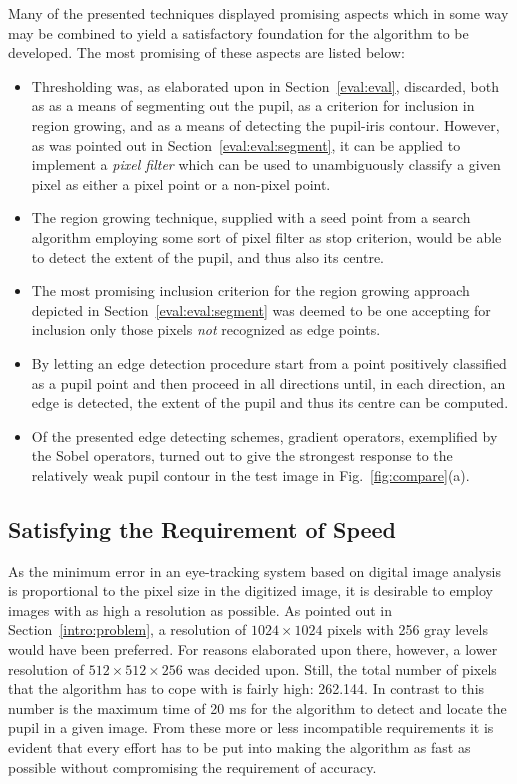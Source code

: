 Many of the presented techniques displayed promising aspects which in
some way may be combined to yield a satisfactory foundation for the
algorithm to be developed.  The most promising of these aspects are
listed below:

\begin{itemize}
\item Thresholding was, as elaborated upon in
  Section~\ref{eval:eval}, discarded, both as as a means of
  segmenting out the pupil, as a criterion for inclusion in region
  growing, and as a means of detecting the pupil-iris contour.
  However, as was pointed out in Section~\ref{eval:eval:segment}, it
  can be applied to implement a {\em pixel filter\/} which can be used
  to unambiguously classify a given pixel as either a pixel point or a
  non-pixel point.
\item The region growing technique, supplied with a seed point from a
  search algorithm employing some sort of pixel filter as stop
  criterion, would be able to detect the extent of the pupil, and thus
  also its centre.
\item The most promising inclusion criterion for the region growing
  approach depicted in Section~\ref{eval:eval:segment} was deemed to
  be one accepting for inclusion only those pixels {\em not\/}
  recognized as edge points.
\item By letting an edge detection procedure start from a point
  positively classified as a pupil point and then proceed in
  all directions until, in each direction, an edge is detected, the
  extent of the pupil and thus its centre can be computed.
\item Of the presented edge detecting schemes, gradient operators,
  exemplified by the Sobel operators, turned out to give the strongest
  response to the relatively weak pupil contour in the test image in
  Fig.~\ref{fig:compare}(a).
\end{itemize}

\subsection{Satisfying the Requirement of Speed}
\label{eval:approach:speed}

As the minimum error in an eye-tracking system based on digital image
analysis is proportional to the pixel size in the digitized image, it
is desirable to employ images with as high a resolution as possible.
As pointed out in Section~\ref{intro:problem}, a resolution of
$1024\times 1024$ pixels with 256 gray levels would have been
preferred.  For reasons elaborated upon there, however, a lower
resolution of $512\times 512\times 256$ was decided upon.  Still, the
total number of pixels that the algorithm has to cope with is fairly
high: 262.144.  In contrast to this number is the maximum time of 20
ms for the algorithm to detect and locate the pupil in a given image.
From these more or less incompatible requirements it is evident that
every effort has to be put into making the algorithm as fast as
possible without compromising the requirement of accuracy.

